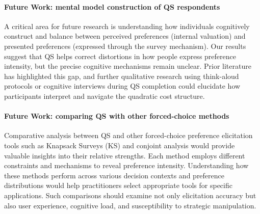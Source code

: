 \paragraph{Future Work: mental model construction of QS respondents}
A critical area for future research is understanding how individuals cognitively construct and balance between perceived preferences (internal valuation) and presented preferences (expressed through the survey mechanism). Our results suggest that QS helps correct distortions in how people express preference intensity, but the precise cognitive mechanisms remain unclear. Prior literature has highlighted this gap, and further qualitative research using think-aloud protocols or cognitive interviews during QS completion could elucidate how participants interpret and navigate the quadratic cost structure.

\paragraph{Future Work: comparing QS with other forced-choice methods}
Comparative analysis between QS and other forced-choice preference elicitation tools such as Knapsack Surveys (KS) and conjoint analysis would provide valuable insights into their relative strengths. Each method employs different constraints and mechanisms to reveal preference intensity. Understanding how these methods perform across various decision contexts and preference distributions would help practitioners select appropriate tools for specific applications. Such comparisons should examine not only elicitation accuracy but also user experience, cognitive load, and susceptibility to strategic manipulation.











